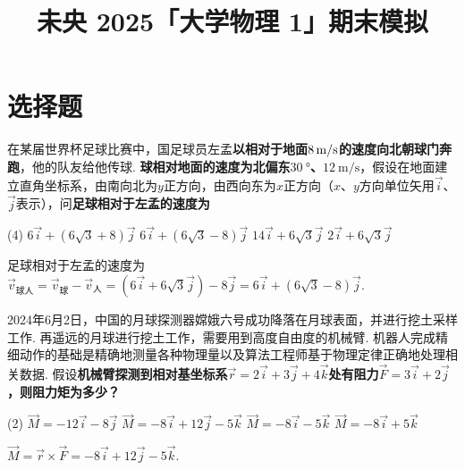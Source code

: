 \documentclass[quiet, fontset = fandol, AutoFakeSlant, 10pt]{ctexart}
\title{\sffamily\bfseries 未央 2025「大学物理 1」期末模拟}
\author{} \date{}
\let \emph \textbf
\begin{document}
\maketitle

% 

\section{选择题}

\begin{problem}
    在某届世界杯足球比赛中，国足球员左孟\emph{以相对于地面$\qty8{\m/\s}$的速度向北朝球门奔跑}，他的队友给他传球. \emph{球相对地面的速度为北偏东$\qty{30}\degree$、$\qty{12}{\m/\s}$}，假设在地面建立直角坐标系，由南向北为$y$正方向，由西向东为$x$正方向（$x$、$y$方向单位矢用$\vec i$、$\vec j$表示），问\emph{足球相对于左孟的速度为}
    \begin{tasks}(4)
        \task $6\vec i+(6\sqrt3+8)\vec j$
        \task[\true] $6\vec i+(6\sqrt3-8)\vec j$
        \task $14\vec i+6\sqrt3\vec j$
        \task $2\vec i+6\sqrt3\vec j$
    \end{tasks}
\end{problem}
\begin{solution}
    足球相对于左孟的速度为$\vec v_\text{球人}=\vec v_\text{球}-\vec v_\text{人}=(6\vec i+6\sqrt3\vec j)-8\vec j=6\vec i+(6\sqrt3-8)\vec j$.
\end{solution}

\begin{problem}
    2024年6月2日，中国的月球探测器嫦娥六号成功降落在月球表面，并进行挖土采样工作. 再遥远的月球进行挖土工作，需要用到高度自由度的机械臂. 机器人完成精细动作的基础是精确地测量各种物理量以及算法工程师基于物理定律正确地处理相关数据. 假设\emph{机械臂探测到相对基坐标系$\vec r=2\vec i+3\vec j+4\vec k$处有阻力$\vec F=3\vec i+2\vec j$，则阻力矩为多少？}
    \begin{tasks}(2)
        \task $\vec M=-12\vec i-8\vec j$
        \task[\true] $\vec M=-8\vec i+12\vec j-5\vec k$
        \task $\vec M=-8\vec i-5\vec k$
        \task $\vec M=-8\vec i+5\vec k$
    \end{tasks}
\end{problem}
\begin{solution}
    $\vec M=\vec r\times\vec F=-8\vec i+12\vec j-5\vec k$.
\end{solution}
\end{document}
